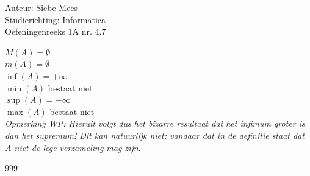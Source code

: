 \documentclass[a4paper]{article}
\begin{document}
  
\noindent \large Auteur: Siebe Mees \\
\noindent \large Studierichting: Informatica\\
\noindent \large Oefeningenreeks 1A nr. 4.7\\

\medskip

\normalsize

$M(A) = \emptyset $\\

$m(A) = \emptyset  $\\

$\inf(A) = + \infty $\\

$\min(A)$ bestaat niet \\

$\sup(A) = - \infty $\\

$\max (A) $ bestaat niet\\

\emph{Opmerking WP: Hieruit volgt dus het bizarre resultaat dat het infimum groter is dan het supremum! Dit kan natuurlijk niet; vandaar dat in de definitie staat dat $A$ niet de lege verzameling mag zijn.}

\begin{thebibliography}{999}

\end{thebibliography}
\end{document}
